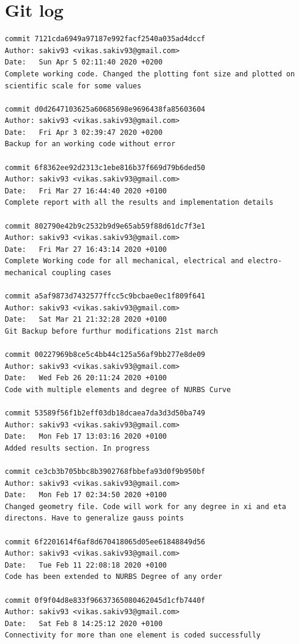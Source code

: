 \documentclass[11pt]{article}
\begin{document}
\section{Git log}
\begin{Verbatim}[breaklines=true]
commit 7121cda6949a97187e992facf2540a035ad4dccf
Author: sakiv93 <vikas.sakiv93@gmail.com>
Date:   Sun Apr 5 02:11:40 2020 +0200
Complete working code. Changed the plotting font size and plotted on scientific scale for some values

commit d0d2647103625a60685698e9696438fa85603604
Author: sakiv93 <vikas.sakiv93@gmail.com>
Date:   Fri Apr 3 02:39:47 2020 +0200
Backup for an working code without error

commit 6f8362ee92d2313c1ebe816b37f669d79b6ded50
Author: sakiv93 <vikas.sakiv93@gmail.com>
Date:   Fri Mar 27 16:44:40 2020 +0100
Complete report with all the results and implementation details

commit 802790e42b9c2532b9d9e65ab59f88d61dc7f3e1
Author: sakiv93 <vikas.sakiv93@gmail.com>
Date:   Fri Mar 27 16:43:14 2020 +0100
Complete Working code for all mechanical, electrical and electro-mechanical coupling cases

commit a5af9873d7432577ffcc5c9bcbae0ec1f809f641
Author: sakiv93 <vikas.sakiv93@gmail.com>
Date:   Sat Mar 21 21:32:28 2020 +0100
Git Backup before furthur modifications 21st march

commit 00227969b8ce5c4bb44c125a56af9bb277e8de09
Author: sakiv93 <vikas.sakiv93@gmail.com>
Date:   Wed Feb 26 20:11:24 2020 +0100
Code with multiple elements and degree of NURBS Curve

commit 53589f56f1b2eff03db18dcaea7da3d3d50ba749
Author: sakiv93 <vikas.sakiv93@gmail.com>
Date:   Mon Feb 17 13:03:16 2020 +0100
Added results section. In progress

commit ce3cb3b705bbc8b3902768fbbefa93d0f9b950bf
Author: sakiv93 <vikas.sakiv93@gmail.com>
Date:   Mon Feb 17 02:34:50 2020 +0100
Changed geometry file. Code will work for any degree in xi and eta directons. Have to generalize gauss points

commit 6f2201614f6af8d670418065d05ee61848849d56
Author: sakiv93 <vikas.sakiv93@gmail.com>
Date:   Tue Feb 11 22:08:18 2020 +0100
Code has been extended to NURBS Degree of any order

commit 0f9f04d8e833f96637365080462045d1cfb7440f
Author: sakiv93 <vikas.sakiv93@gmail.com>
Date:   Sat Feb 8 14:25:12 2020 +0100
Connectivity for more than one element is coded successfully


\end{Verbatim}
\end{document}
